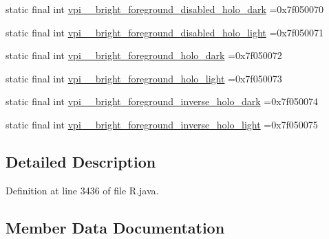 \begin{DoxyCompactItemize}
\item 
static final int \mbox{\hyperlink{classcom_1_1example_1_1trainawearapplication_1_1_r_1_1color_aef59e38cd7bfb0c326f154d0888c679c}{vpi\+\_\+\+\_\+bright\+\_\+foreground\+\_\+disabled\+\_\+holo\+\_\+dark}} =0x7f050070
\item 
static final int \mbox{\hyperlink{classcom_1_1example_1_1trainawearapplication_1_1_r_1_1color_a5f9fb3d5150539994c0af6883a3bae8b}{vpi\+\_\+\+\_\+bright\+\_\+foreground\+\_\+disabled\+\_\+holo\+\_\+light}} =0x7f050071
\item 
static final int \mbox{\hyperlink{classcom_1_1example_1_1trainawearapplication_1_1_r_1_1color_a3abb7836731438e34071ca0f4c39bc46}{vpi\+\_\+\+\_\+bright\+\_\+foreground\+\_\+holo\+\_\+dark}} =0x7f050072
\item 
static final int \mbox{\hyperlink{classcom_1_1example_1_1trainawearapplication_1_1_r_1_1color_a490109f0bbdb53fe70bcdd743d223610}{vpi\+\_\+\+\_\+bright\+\_\+foreground\+\_\+holo\+\_\+light}} =0x7f050073
\item 
static final int \mbox{\hyperlink{classcom_1_1example_1_1trainawearapplication_1_1_r_1_1color_a015b013e6921eea4e9592465e08c859c}{vpi\+\_\+\+\_\+bright\+\_\+foreground\+\_\+inverse\+\_\+holo\+\_\+dark}} =0x7f050074
\item 
static final int \mbox{\hyperlink{classcom_1_1example_1_1trainawearapplication_1_1_r_1_1color_a92e0ff49cbb2ed8d7d3df49f9e95cd6a}{vpi\+\_\+\+\_\+bright\+\_\+foreground\+\_\+inverse\+\_\+holo\+\_\+light}} =0x7f050075
\end{DoxyCompactItemize}


\subsection{Detailed Description}


Definition at line 3436 of file R.\+java.



\subsection{Member Data Documentation}
\mbox{\label{classcom_1_1example_1_1trainawearapplication_1_1_r_1_1color_a6581ed6caec163c0b54cc5f2a66d9a1f}} 
